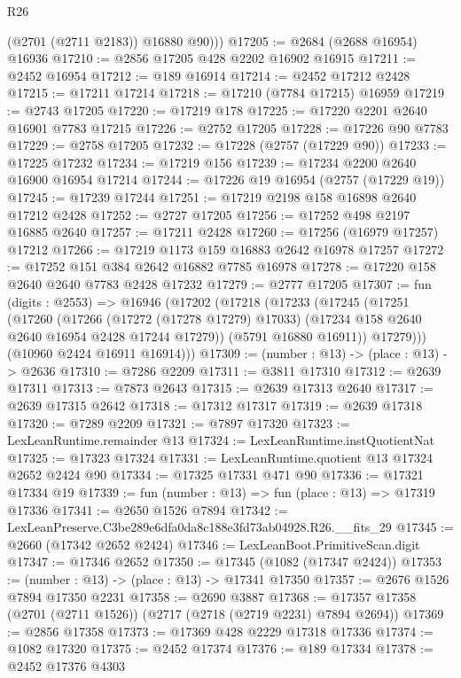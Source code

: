 \begin{lexlean}{R26}
\begin{coremodule}
          (@2701 (@2711 @2183))
          @16880
          @90)))
@17205 := @2684 (@2688 @16954) @16936
@17210 := @2856 @17205 @428 @2202 @16902 @16915
@17211 := @2452 @16954
@17212 := @189 @16914
@17214 := @2452 @17212 @2428
@17215 := @17211 @17214
@17218 := @17210 (@7784 @17215) @16959
@17219 := @2743 @17205
@17220 := @17219 @178
@17225 := @17220 @2201 @2640 @16901 @7783 @17215
@17226 := @2752 @17205
@17228 := @17226 @90 @7783
@17229 := @2758 @17205
@17232 := @17228 (@2757 (@17229 @90))
@17233 := @17225 @17232
@17234 := @17219 @156
@17239 := @17234 @2200 @2640 @16900 @16954 @17214
@17244 := @17226 @19 @16954 (@2757 (@17229 @19))
@17245 := @17239 @17244
@17251 := @17219 @2198 @158 @16898 @2640 @17212 @2428
@17252 := @2727 @17205
@17256 := @17252 @498 @2197 @16885 @2640
@17257 := @17211 @2428
@17260 := @17256 (@16979 @17257) @17212
@17266 := @17219 @1173 @159 @16883 @2642 @16978 @17257
@17272 := @17252 @151 @384 @2642 @16882 @7785 @16978
@17278 := @17220 @158 @2640 @2640 @7783 @2428 @17232
@17279 := @2777 @17205
@17307 := fun (digits : @2553) =>
  @16946
    (@17202
      (@17218
        (@17233
          (@17245
            (@17251
              (@17260
                (@17266
                  (@17272 (@17278 @17279) @17033)
                  (@17234 @158 @2640 @2640 @16954 @2428 @17244 @17279))
                (@5791 @16880 @16911))
              @17279)))
        (@10960 @2424 @16911 @16914)))
@17309 := (number : @13) -> (place : @13) -> @2636
@17310 := @7286 @2209
@17311 := @3811 @17310
@17312 := @2639 @17311
@17313 := @7873 @2643
@17315 := @2639 @17313 @2640
@17317 := @2639 @17315 @2642
@17318 := @17312 @17317
@17319 := @2639 @17318
@17320 := @7289 @2209
@17321 := @7897 @17320
@17323 := LexLeanRuntime.remainder @13
@17324 := LexLeanRuntime.instQuotientNat
@17325 := @17323 @17324
@17331 := LexLeanRuntime.quotient @13 @17324 @2652 @2424 @90
@17334 := @17325 @17331 @471 @90
@17336 := @17321 @17334 @19
@17339 := fun (number : @13) => fun (place : @13) => @17319 @17336
@17341 := @2650 @1526 @7894
@17342 := LexLeanPreserve.C3be289e6dfa0da8c188e3fd73ab04928.R26.__fits_29
@17345 := @2660 (@17342 @2652 @2424)
@17346 := LexLeanBoot.PrimitiveScan.digit
@17347 := @17346 @2652
@17350 := @17345 (@1082 (@17347 @2424))
@17353 := (number : @13) -> (place : @13) -> @17341 @17350
@17357 := @2676 @1526 @7894 @17350 @2231
@17358 := @2690 @3887
@17368 := @17357 @17358 (@2701 (@2711 @1526)) (@2717 (@2718 (@2719 @2231) @7894 @2694))
@17369 := @2856 @17358
@17373 := @17369 @428 @2229 @17318 @17336
@17374 := @1082 @17320
@17375 := @2452 @17374
@17376 := @189 @17334
@17378 := @2452 @17376 @4303

\end{coremodule}
\end{lexlean}
